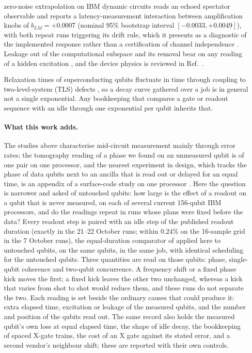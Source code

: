 \documentclass[reprint,amsmath,amssymb,aps,superscriptaddress,nofootinbib]{revtex4-2}
\begin{document}
zero-noise extrapolation on IBM dynamic circuits reads an echoed spectator observable and reports a latency-measurement interaction between amplification knobs of $b_{LM}=+0.0007$ (nominal 95\% bootstrap interval $[-0.0033,+0.0049]$), with both repeat runs triggering its drift rule, which it presents as a diagnostic of the implemented response rather than a certification of channel independence \cite{KumarA2026}. Leakage out of the computational subspace and its removal bear on any reading of a hidden excitation \cite{McEwen2021}, and the device physics is reviewed in Ref.~\cite{Krantz2019}.

Relaxation times of superconducting qubits fluctuate in time through coupling to two-level-system (TLS) defects \cite{Klimov2018,Schlor2019,Burnett2019,Carroll2022,Muller2019}, so a decay curve gathered over a job is in general not a single exponential. Any bookkeeping that compares a gate or readout sequence with an idle through one exponential per qubit inherits that.

\paragraph*{What this work adds.} The studies above characterise mid-circuit measurement mainly through error rates; the tomography reading of a phase we found on an unmeasured qubit is of one pair on one processor, and the nearest experiment in design, which tracks the phase of data qubits next to an ancilla that is read out or delayed for an equal time, is an appendix of a surface-code study on one processor \cite{Kan2026}. Here the question is narrower and asked of untouched qubits: how large is the effect of a readout on a qubit that is never measured, on each of several current 156-qubit IBM processors, and do the readings repeat in runs whose plans were fixed before the data? Every readout step is paired with an idle step of the published readout duration (exactly in the 21--22 October runs; within 0.24\% on the 16-sample grid in the 7 October runs), the equal-duration comparator of \cite{Govia2023} applied here to untouched qubits, on the same qubits, in the same job, with identical scheduling for the untouched qubits. Three quantities are read on those qubits: phase, single-qubit coherence and two-qubit concurrence. A frequency shift or a fixed phase kick moves the first; a fixed kick leaves the other two unchanged, whereas a kick that varies from shot to shot would reduce them, and these runs do not separate the two. Each reading is set beside the ordinary causes that could produce it: extra elapsed time, excitation or leakage of the measured qubits, and the number and position of the qubits read out. The same record also holds the measured qubit's own loss at equal elapsed time, the shape of idle decay, the bookkeeping of spaced X-gate trains, the cost of an X gate against its stated error, and a second vendor's neighbour shift; these are reported with their own controls.
\end{document}
